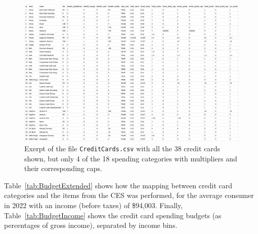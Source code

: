 \begin{landscape}
    \begin{figure}[t!h]
        \begin{center}
        \includegraphics[scale=0.45]{../Misc/CreditCardsCSV.png}
        \caption{Exerpt of the file \texttt{CreditCards.csv} with all the 38 credit cards shown, but only 4 of the 18 spending categories with multipliers and their corresponding caps.}
        \label{fig:CreditCardsCSV}
        \end{center}
    \end{figure}
\end{landscape}



Table~\ref{tab:BudgetExtended} shows how the mapping between credit card categories and the items from the CES was performed, for the average consumer in 2022 with an income (before taxes) of \$94,003.
Finally, Table~\ref{tab:BudgetIncome} shows the credit card spending budgets (as percentages of gross income), separated by income bins. 

\begin{landscape}
    
    
\end{landscape}